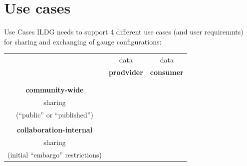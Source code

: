 \documentclass[aspectratio=169,xcolor=dvipsnames]{beamer}
\newcommand{\green}{\color{g3}}
\def\Dok{\ding{52}}
\begin{document}
\section{Use cases}
\begin{frame}{Use Cases}
  ILDG needs to support 4 different use cases
  (and user requiremnts) \\
  for sharing and exchanging of gauge configurations:

  \begin{center}
    \begin{tabular}{c||c|c}
      & data  &  data
      \\
      & \bf prodvider & \bf consumer
      \\
      &&\\ \hline \hline &&\\
      \bf community-wide & \green \Dok & \green \Dok 
      \\  sharing &&
      \\ (``public'' or ``published'') &&
      \\ \hline && \\
      \bf collaboration-internal  & \green \Dok & \green \Dok 
      \\  sharing &&
      \\ (initial ``embargo'' restrictions) &&
    \end{tabular}
    \hspace*{20mm}
  \end{center}
  
\end{frame}
\end{document}
